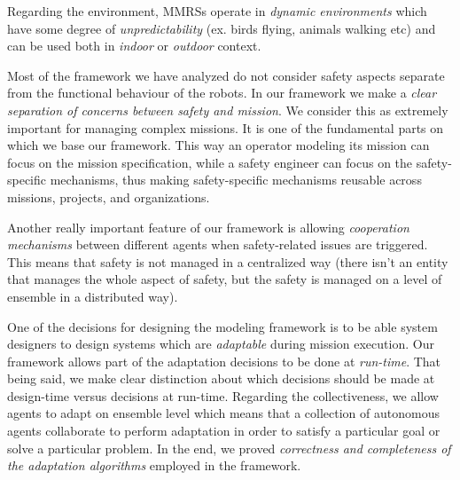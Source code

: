 \documentclass[journal]{IEEEtran}
\theoremstyle{definition}
\begin{document}
Regarding the environment, MMRSs operate in \textit{dynamic environments} which have some degree of \textit{unpredictability} (ex. birds flying, animals walking etc) and can be used both in \textit{indoor} or \textit{outdoor} context.

Most of the framework we have analyzed do not consider safety aspects separate from the functional behaviour of the robots. In our framework we make a \textit{clear separation of concerns between safety and mission}. We consider this as extremely important for managing complex missions. It is one of the fundamental parts on which we base our framework. This way an operator modeling its mission can focus on the mission specification, while a safety engineer can focus on the safety-specific mechanisms, thus making safety-specific mechanisms reusable across missions, projects, and organizations.

Another really important feature of our framework is allowing \textit{cooperation mechanisms} between different agents when safety-related issues are triggered. This means that safety is not managed in a centralized way (there isn't an  entity that manages the whole aspect of safety, but the safety is managed on a level of ensemble in a distributed way).

One of the decisions for designing the modeling framework is to be able system designers to design systems which are \textit{adaptable} during mission execution. Our framework allows part of the adaptation decisions to be done at \textit{run-time}. That being said, we make clear distinction about which decisions should be made at design-time versus decisions at run-time. Regarding the collectiveness, we allow agents to adapt on ensemble level which means that a collection of autonomous agents collaborate to perform adaptation in order to satisfy a particular goal or solve a particular problem. 
In the end, we proved \textit{correctness and completeness of the adaptation algorithms} employed in the framework.


\end{document}

